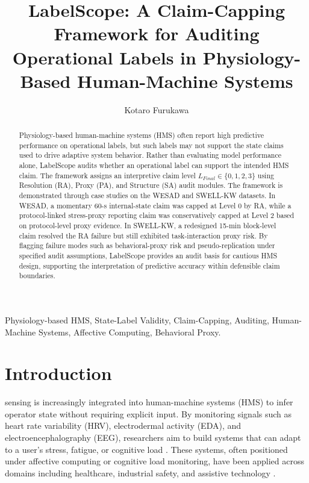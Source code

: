\documentclass[journal]{IEEEtran}
\begin{document}
\title{LabelScope: A Claim-Capping Framework for Auditing Operational Labels in Physiology-Based Human-Machine Systems}

\author{Kotaro Furukawa}

\maketitle

\begin{abstract}
Physiology-based human-machine systems (HMS) often report high predictive performance on operational labels, but such labels may not support the state claims used to drive adaptive system behavior. Rather than evaluating model performance alone, LabelScope audits whether an operational label can support the intended HMS claim. The framework assigns an interpretive claim level $L_{Final} \in \{0,1,2,3\}$ using Resolution (RA), Proxy (PA), and Structure (SA) audit modules. The framework is demonstrated through case studies on the WESAD and SWELL-KW datasets. In WESAD, a momentary 60-s internal-state claim was capped at Level 0 by RA, while a protocol-linked stress-proxy reporting claim was conservatively capped at Level 2 based on protocol-level proxy evidence. In SWELL-KW, a redesigned 15-min block-level claim resolved the RA failure but still exhibited task-interaction proxy risk. By flagging failure modes such as behavioral-proxy risk and pseudo-replication under specified audit assumptions, LabelScope provides an audit basis for cautious HMS design, supporting the interpretation of predictive accuracy within defensible claim boundaries.
\end{abstract}

\begin{IEEEkeywords}
Physiology-based HMS, State-Label Validity, Claim-Capping, Auditing, Human-Machine Systems, Affective Computing, Behavioral Proxy.
\end{IEEEkeywords}

\section{Introduction}

 sensing is increasingly integrated into human-machine systems (HMS) to infer operator state without requiring explicit input. By monitoring signals such as heart rate variability (HRV), electrodermal activity (EDA), and electroencephalography (EEG), researchers aim to build systems that can adapt to a user's stress, fatigue, or cognitive load \cite{picard1997,martinez2017,cheng2020}. These systems, often positioned under affective computing or cognitive load monitoring, have been applied across domains including healthcare, industrial safety, and assistive technology \cite{parasuraman2000}.
\end{document}

